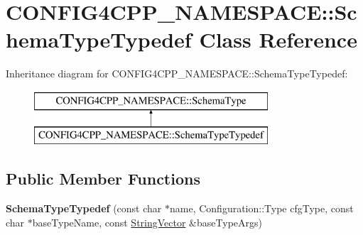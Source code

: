 \hypertarget{classCONFIG4CPP__NAMESPACE_1_1SchemaTypeTypedef}{\section{C\-O\-N\-F\-I\-G4\-C\-P\-P\-\_\-\-N\-A\-M\-E\-S\-P\-A\-C\-E\-:\-:Schema\-Type\-Typedef Class Reference}
\label{classCONFIG4CPP__NAMESPACE_1_1SchemaTypeTypedef}
}
Inheritance diagram for C\-O\-N\-F\-I\-G4\-C\-P\-P\-\_\-\-N\-A\-M\-E\-S\-P\-A\-C\-E\-:\-:Schema\-Type\-Typedef\-:\begin{figure}[H]
\begin{center}
\leavevmode
\includegraphics[height=2.000000cm]{classCONFIG4CPP__NAMESPACE_1_1SchemaTypeTypedef}
\end{center}
\end{figure}
\subsection*{Public Member Functions}
\begin{DoxyCompactItemize}
\item 
\hypertarget{classCONFIG4CPP__NAMESPACE_1_1SchemaTypeTypedef_ae8e8cb7914fabf1606b98944588e8efb}{{\bfseries Schema\-Type\-Typedef} (const char $\ast$name, Configuration\-::\-Type cfg\-Type, const char $\ast$base\-Type\-Name, const \hyperlink{classCONFIG4CPP__NAMESPACE_1_1StringVector}{String\-Vector} \&base\-Type\-Args)}\label{classCONFIG4CPP__NAMESPACE_1_1SchemaTypeTypedef_ae8e8cb7914fabf1606b98944588e8efb}

\end{DoxyCompactItemize}
